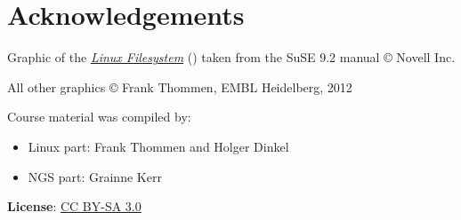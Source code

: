\documentclass[a4paper,11pt,english]{sphinxmanual}
\begin{document}
\chapter{Acknowledgements}
\label{acknowledgments:acknowledgements}\label{acknowledgments::doc}
Graphic of the {\hyperref[introduction:figure-filesystem]{\emph{Linux Filesystem}}} () taken from the SuSE 9.2 manual © Novell Inc.

All other graphics © Frank Thommen, EMBL Heidelberg, 2012

Course material was compiled by:
\begin{itemize}
\item {} 
Linux part: Frank Thommen and Holger Dinkel

\item {} 
NGS part:   Grainne Kerr

\end{itemize}

\textbf{License}:
\href{http://creativecommons.org/licenses/by-sa/3.0/}{CC BY-SA 3.0}



\renewcommand{\indexname}{Index}
\end{document}

